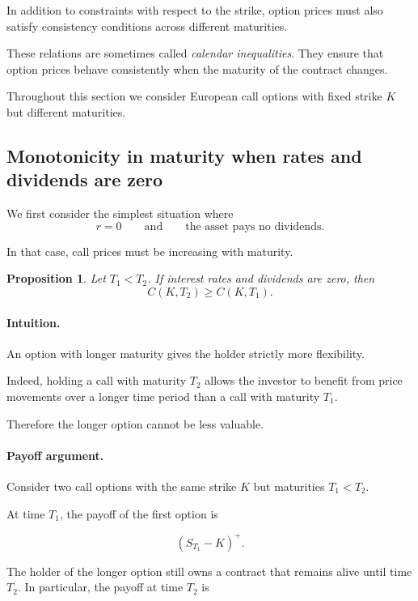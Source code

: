 \documentclass[11pt]{article}
\newcommand{\1}{\mathbf{1}}
\theoremstyle{plain}
\newtheorem{proposition}[theorem]{Proposition}
\theoremstyle{definition}
\theoremstyle{remark}
\begin{document}
In addition to constraints with respect to the strike,
option prices must also satisfy consistency conditions across
different maturities.

These relations are sometimes called \emph{calendar inequalities}.
They ensure that option prices behave consistently when the maturity
of the contract changes.

Throughout this section we consider European call options with
fixed strike \(K\) but different maturities.

\subsection{Monotonicity in maturity when rates and dividends are zero}

We first consider the simplest situation where
\[
r = 0
\qquad\text{and}\qquad
\text{the asset pays no dividends}.
\]

In that case, call prices must be increasing with maturity.

\begin{proposition}
Let \(T_1 < T_2\).
If interest rates and dividends are zero, then
\[
C(K,T_2) \ge C(K,T_1).
\]
\end{proposition}

\paragraph{Intuition.}

An option with longer maturity gives the holder strictly more
flexibility.

Indeed, holding a call with maturity \(T_2\) allows the investor to
benefit from price movements over a longer time period than a call
with maturity \(T_1\).

Therefore the longer option cannot be less valuable.

\paragraph{Payoff argument.}

Consider two call options with the same strike \(K\)
but maturities \(T_1<T_2\).

At time \(T_1\), the payoff of the first option is

\[
(S_{T_1}-K)^+ .
\]

The holder of the longer option still owns a contract
that remains alive until time \(T_2\).
In particular, the payoff at time \(T_2\) is
\end{document}
